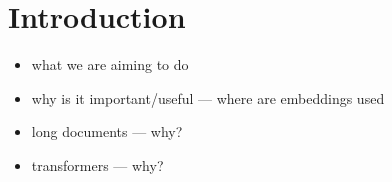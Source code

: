 \chapter*{Introduction}

\begin{itemize}
    \item what we are aiming to do
    \item why is it important/useful --- where are embeddings used
    \item long documents --- why?
    \item transformers --- why?
\end{itemize}
